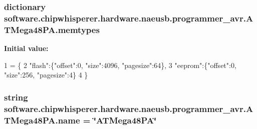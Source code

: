 \subsubsection[{memtypes}]{\setlength{\rightskip}{0pt plus 5cm}dictionary software.\+chipwhisperer.\+hardware.\+naeusb.\+programmer\+\_\+avr.\+A\+T\+Mega48\+P\+A.\+memtypes\hspace{0.3cm}{\ttfamily [static]}}\label{classsoftware_1_1chipwhisperer_1_1hardware_1_1naeusb_1_1programmer__avr_1_1ATMega48PA_a74f7cbe034c5697d65208d25c9cd6b9b}
{\bfseries Initial value\+:}
\begin{DoxyCode}
1 = \{
2        \textcolor{stringliteral}{"flash"}:\{\textcolor{stringliteral}{"offset"}:0, \textcolor{stringliteral}{"size"}:4096, \textcolor{stringliteral}{"pagesize"}:64\},
3        \textcolor{stringliteral}{"eeprom"}:\{\textcolor{stringliteral}{"offset"}:0, \textcolor{stringliteral}{"size"}:256, \textcolor{stringliteral}{"pagesize"}:4\}
4      \}
\end{DoxyCode}
\hypertarget{classsoftware_1_1chipwhisperer_1_1hardware_1_1naeusb_1_1programmer__avr_1_1ATMega48PA_ae2565c867bde822e661144b9e8c30441}{}
\subsubsection[{name}]{\setlength{\rightskip}{0pt plus 5cm}string software.\+chipwhisperer.\+hardware.\+naeusb.\+programmer\+\_\+avr.\+A\+T\+Mega48\+P\+A.\+name = \char`\"{}A\+T\+Mega48\+P\+A\char`\"{}\hspace{0.3cm}{\ttfamily [static]}}\label{classsoftware_1_1chipwhisperer_1_1hardware_1_1naeusb_1_1programmer__avr_1_1ATMega48PA_ae2565c867bde822e661144b9e8c30441}
\hypertarget{classsoftware_1_1chipwhisperer_1_1hardware_1_1naeusb_1_1programmer__avr_1_1ATMega48PA_a86ccd541d3d0866f7fdebdd06a7b7073}{}
